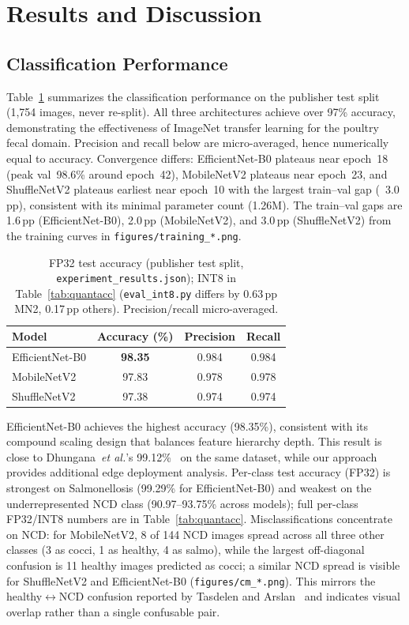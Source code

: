 \documentclass[conference,a4paper]{IEEEtran}
\begin{document}
\section{Results and Discussion}

\subsection{Classification Performance}

Table~\ref{tab:results} summarizes the classification performance on the publisher test split (1,754 images, never re-split). All three architectures achieve over 97\% accuracy, demonstrating the effectiveness of ImageNet transfer learning for the poultry fecal domain. Precision and recall below are micro-averaged, hence numerically equal to accuracy. Convergence differs: EfficientNet-B0 plateaus near epoch~18 (peak val~98.6\% around epoch~42), MobileNetV2 plateaus near epoch~23, and ShuffleNetV2 plateaus earliest near epoch~10 with the largest train--val gap (~3.0\,pp), consistent with its minimal parameter count (1.26M). The train--val gaps are 1.6\,pp (EfficientNet-B0), 2.0\,pp (MobileNetV2), and 3.0\,pp (ShuffleNetV2) from the training curves in \texttt{figures/training\_*.png}.

\begin{table}[htbp]
\caption{FP32 test accuracy (publisher test split, \texttt{experiment\_results.json}); INT8 in Table~\ref{tab:quantacc} (\texttt{eval\_int8.py} differs by 0.63\,pp MN2, 0.17\,pp others). Precision/recall micro-averaged.}
\label{tab:results}
\centering
\begin{tabular}{lccc}
\toprule
Model & Accuracy (\%) & Precision & Recall \\
\midrule
EfficientNet-B0 & \textbf{98.35} & 0.984 & 0.984 \\
MobileNetV2 & 97.83 & 0.978 & 0.978 \\
ShuffleNetV2 & 97.38 & 0.974 & 0.974 \\
\bottomrule
\end{tabular}
\end{table}

EfficientNet-B0 achieves the highest accuracy (98.35\%), consistent with its compound scaling design that balances feature hierarchy depth. This result is close to Dhungana~\textit{et al.}'s 99.12\%~\cite{dhungana2025} on the same dataset, while our approach provides additional edge deployment analysis. Per-class test accuracy (FP32) is strongest on Salmonellosis (99.29\% for EfficientNet-B0) and weakest on the underrepresented NCD class (90.97--93.75\% across models); full per-class FP32/INT8 numbers are in Table~\ref{tab:quantacc}. Misclassifications concentrate on NCD: for MobileNetV2, 8 of 144 NCD images spread across all three other classes (3 as cocci, 1 as healthy, 4 as salmo), while the largest off-diagonal confusion is 11 healthy images predicted as cocci; a similar NCD spread is visible for ShuffleNetV2 and EfficientNet-B0 (\texttt{figures/cm\_*.png}). This mirrors the healthy$\leftrightarrow$NCD confusion reported by Tasdelen and Arslan~\cite{tasdelen2025} and indicates visual overlap rather than a single confusable pair.
\end{document}
